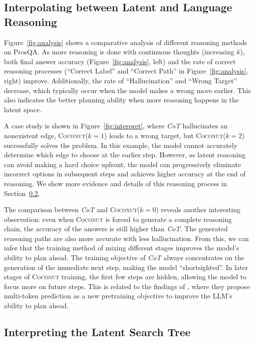 \documentclass[]{fairmeta}
\newcommand{\ours}{\textsc{Coconut}\xspace}
\begin{document}
\subsection{Interpolating between Latent and Language Reasoning}

\label{sec:understanding_results}


Figure~\ref{fig:analysis} shows a comparative analysis of different reasoning methods on ProsQA. As more reasoning is done with continuous thoughts (increasing $k$), both final answer accuracy (Figure~\ref{fig:analysis}, left) and the rate of correct reasoning processes (``Correct Label'' and ``Correct Path'' in Figure~\ref{fig:analysis}, right) improve. Additionally, the rate of ``Hallucination'' and ``Wrong Target'' decrease, which typically occur when the model makes a wrong move earlier. This also indicates the better planning ability when more reasoning happens in the latent space.

A case study is shown in Figure~\ref{fig:interpret}, where \textit{CoT} hallucinates an nonexistent edge, \ours ($k=1$) leads to a wrong target, but \ours ($k=2$) successfully solves the problem. In this example, the model cannot accurately determine which edge to choose at the earlier step. However, as latent reasoning can avoid making a hard choice upfront, the model can progressively eliminate incorrect options in subsequent steps and achieves higher accuracy at the end of reasoning. We show more evidence and details of this reasoning process in Section~\ref{sec:interpret}. 


The comparison between \textit{CoT} and \ours ($k=0$) reveals another interesting observation: even when \ours is forced to generate a complete reasoning chain, the accuracy of the answers is still higher than \textit{CoT}. The generated reasoning paths are also more accurate with less hallucination. From this, we can infer that the training method of mixing different stages improves the model's ability to plan ahead. The training objective of \textit{CoT} always concentrates on the generation of the immediate next step, making the model ``shortsighted''. In later stages of \ours training, the first few steps are hidden, allowing the model to focus more on future steps. This is related to the findings of \citet{gloeckle2024better}, where they propose multi-token prediction as a new pretraining objective to improve the LLM's ability to plan ahead.



\subsection{Interpreting the Latent Search Tree}
\label{sec:interpret}
\end{document}
